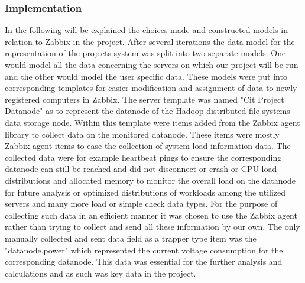 \subsubsection{Implementation}
	In the following will be explained the choices made and constructed models in relation to Zabbix in the project.
	After several iterations the data model for the representation of the projects system was split into two separate models. One would model all the data concerning the servers on which our project will be run and the other would model the user specific data. These models were put into corresponding templates for easier modification and assignment of data to newly registered computers in Zabbix.
	The server template was named "Cit Project Datanode" as to represent the datanode of the Hadoop distributed file systems data storage node. Within this template were items added from the Zabbix agent library to collect data on the monitored datanode. These items were mostly Zabbix agent items to ease the collection of system load information data. The collected data were for example heartbeat pings to ensure the corresponding datanode can still be reached and did not disconnect or crash or CPU load distributions and allocated memory to monitor the overall load on the datanode for future analysis or optimized distributions of workloads among the utilized servers and many more load or simple check data types. For the purpose of collecting such data in an efficient manner it was chosen to use the Zabbix agent rather than trying to collect and send all these information by our own. The only manually collected and sent data field as a trapper type item was the "datanode.power" which represented the current voltage consumption for the corresponding datanode. This data was essential for the further analysis and calculations and as such was key data in the project.
